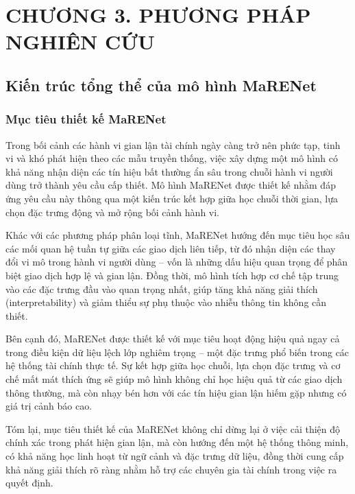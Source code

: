 \newpage
\section*{CHƯƠNG 3. PHƯƠNG PHÁP NGHIÊN CỨU  }
\label{chap:focalloss}


\setcounter{section}{3}
\setcounter{subsection}{0}
\setcounter{figure}{0}
\setcounter{table}{0}

\subsection{Kiến trúc tổng thể của mô hình MaRENet}

\subsubsection{Mục tiêu thiết kế MaRENet}

Trong bối cảnh các hành vi gian lận tài chính ngày càng trở nên phức tạp, tinh vi và khó phát hiện theo các mẫu truyền thống, việc xây dựng một mô hình có khả năng nhận diện các tín hiệu bất thường ẩn sâu trong chuỗi hành vi người dùng trở thành yêu cầu cấp thiết. Mô hình MaRENet được thiết kế nhằm đáp ứng yêu cầu này thông qua một kiến trúc kết hợp giữa học chuỗi thời gian, lựa chọn đặc trưng động và mở rộng bối cảnh hành vi.

Khác với các phương pháp phân loại tĩnh, MaRENet hướng đến mục tiêu học sâu các mối quan hệ tuần tự giữa các giao dịch liên tiếp, từ đó nhận diện các thay đổi vi mô trong hành vi người dùng – vốn là những dấu hiệu quan trọng để phân biệt giao dịch hợp lệ và gian lận. Đồng thời, mô hình tích hợp cơ chế tập trung vào các đặc trưng đầu vào quan trọng nhất, giúp tăng khả năng giải thích (interpretability) và giảm thiểu sự phụ thuộc vào nhiễu thông tin không cần thiết.

Bên cạnh đó, MaRENet được thiết kế với mục tiêu hoạt động hiệu quả ngay cả trong điều kiện dữ liệu lệch lớp nghiêm trọng – một đặc trưng phổ biến trong các hệ thống tài chính thực tế. Sự kết hợp giữa học chuỗi, lựa chọn đặc trưng và cơ chế mất mát thích ứng sẽ giúp mô hình không chỉ học hiệu quả từ các giao dịch thông thường, mà còn nhạy bén hơn với các tín hiệu gian lận hiếm gặp nhưng có giá trị cảnh báo cao.

Tóm lại, mục tiêu thiết kế của MaRENet không chỉ dừng lại ở việc cải thiện độ chính xác trong phát hiện gian lận, mà còn hướng đến một hệ thống thông minh, có khả năng học linh hoạt từ ngữ cảnh và đặc trưng dữ liệu, đồng thời cung cấp khả năng giải thích rõ ràng nhằm hỗ trợ các chuyên gia tài chính trong việc ra quyết định.

